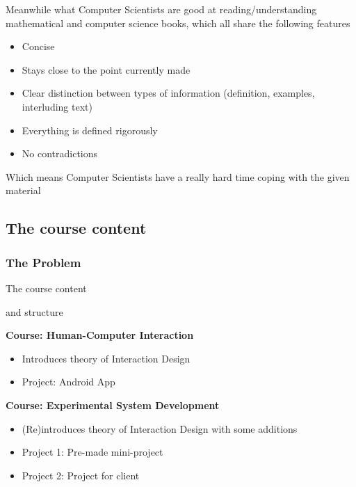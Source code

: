 \begin{frame}
  Meanwhile what Computer Scientists are good at reading/understanding
  mathematical and computer science books, which all share the following features

  \begin{itemize}
  \item Concise
  \item Stays close to the point currently made
  \item Clear distinction between types of information (definition, examples,
    interluding text)
  \item Everything is defined rigorously
  \item No contradictions
  \end{itemize}

  Which means Computer Scientists have a really hard time coping with the given
  material
\end{frame}

\subsection{The course content}
\begin{frame}
  \frametitle{The Problem}
  \Huge{\centerline{
      The course content}
  \centerline{and structure}}  
\end{frame}


\begin{frame}
  \textbf{Course: Human-Computer Interaction}
  \begin{itemize}
  \item Introduces theory of Interaction Design
  \item Project: Android App
  \end{itemize}

  \medskip
  
  \textbf{Course: Experimental System Development}
  \begin{itemize}
  \item (Re)introduces theory of Interaction Design with some additions
  \item Project 1: Pre-made mini-project
  \item Project 2: Project for client
  \end{itemize}  
\end{frame}

